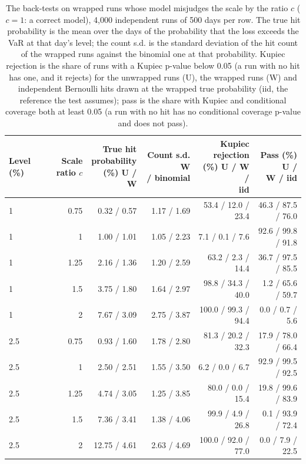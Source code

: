 \begin{table}[htbp]
\centering
\small
\caption{The back-tests on wrapped runs whose model misjudges the scale by the ratio $c$ ($c = 1$: a correct model), 4,000 independent runs of 500 days per row. The true hit probability is the mean over the days of the probability that the loss exceeds the VaR at that day's level; the count s.d. is the standard deviation of the hit count of the wrapped runs against the binomial one at that probability. Kupiec rejection is the share of runs with a Kupiec p-value below 0.05 (a run with no hit has one, and it rejects) for the unwrapped runs (U), the wrapped runs (W) and independent Bernoulli hits drawn at the wrapped true probability (iid, the reference the test assumes); pass is the share with Kupiec and conditional coverage both at least 0.05 (a run with no hit has no conditional coverage p-value and does not pass).}
\label{tab:dispersion}
{\footnotesize\setlength{\tabcolsep}{4pt}
\begin{adjustbox}{max width=\textwidth}
\begin{tabular}{lrrrrr}
\toprule
Level (\%) & \makecell[br]{Scale ratio \\ $c$} & \makecell[br]{True hit \\ probability \\ (\%) U / W} & \makecell[br]{Count s.d. W \\ / binomial} & \makecell[br]{Kupiec \\ rejection \\ (\%) U / W / \\ iid} & \makecell[br]{Pass (\%) U / \\ W / iid} \\
\midrule
1 & 0.75 & 0.32 / 0.57 & 1.17 / 1.69 & 53.4 / 12.0 / 23.4 & 46.3 / 87.5 / 76.0 \\
1 & 1 & 1.00 / 1.01 & 1.05 / 2.23 & 7.1 / 0.1 / 7.6 & 92.6 / 99.8 / 91.8 \\
1 & 1.25 & 2.16 / 1.36 & 1.20 / 2.59 & 63.2 / 2.3 / 14.4 & 36.7 / 97.5 / 85.5 \\
1 & 1.5 & 3.75 / 1.80 & 1.64 / 2.97 & 98.8 / 34.3 / 40.0 & 1.2 / 65.6 / 59.7 \\
1 & 2 & 7.67 / 3.09 & 2.75 / 3.87 & 100.0 / 99.3 / 94.4 & 0.0 / 0.7 / 5.6 \\
2.5 & 0.75 & 0.93 / 1.60 & 1.78 / 2.80 & 81.3 / 20.2 / 32.3 & 17.9 / 78.0 / 66.4 \\
2.5 & 1 & 2.50 / 2.51 & 1.55 / 3.50 & 6.2 / 0.0 / 6.7 & 92.9 / 99.5 / 92.5 \\
2.5 & 1.25 & 4.74 / 3.05 & 1.25 / 3.85 & 80.0 / 0.0 / 15.4 & 19.8 / 99.6 / 83.9 \\
2.5 & 1.5 & 7.36 / 3.41 & 1.38 / 4.06 & 99.9 / 4.9 / 26.8 & 0.1 / 93.9 / 72.4 \\
2.5 & 2 & 12.75 / 4.61 & 2.63 / 4.69 & 100.0 / 92.0 / 77.0 & 0.0 / 7.9 / 22.5 \\
\bottomrule
\end{tabular}
\end{adjustbox}}
\end{table}
